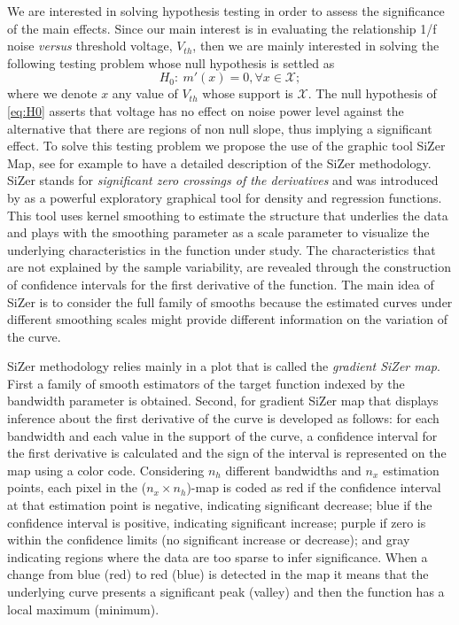 \documentclass[sn-mathphys]{sn-jnl}%
\theoremstyle{thmstyleone}%
\theoremstyle{thmstyletwo}%
\theoremstyle{thmstylethree}%
\begin{document}
\noindent We are interested in solving hypothesis testing in order to assess the significance of the main effects. Since our main interest is in evaluating the relationship 1/f noise \textit{versus} threshold voltage, $V_{th}$, then we are mainly interested in solving the following testing problem whose null hypothesis is settled as
\begin{equation}\label{eq:H0}
	H_0: \   m'(x)=0, \forall x \in \mathcal{X}; 
\end{equation}
where we denote $x$ any value of $V_{th}$ whose support is $\mathcal{X}$. The null hypothesis of \eqref{eq:H0} asserts that voltage has no effect on noise power level against the alternative that there are regions of non null slope, thus implying a significant effect. 
To solve this testing problem we propose the use of the graphic tool SiZer Map, see for example \cite{GNR2020} to have a detailed description of the SiZer methodology.
SiZer stands for \textit{significant zero crossings of the derivatives} and was introduced by \cite{CM1999} as a powerful exploratory graphical tool for density and regression functions. This tool uses kernel smoothing to estimate the structure that underlies the data and plays with the smoothing parameter as a scale parameter to visualize the underlying characteristics in the function under study. The characteristics that are not explained by the sample variability, are revealed through the construction of confidence intervals for the first derivative of the function. The main idea of SiZer is to consider the full family of smooths because the estimated curves under different smoothing scales might provide different information on the variation of the curve. 


SiZer methodology relies mainly in a plot that is called the \textit{gradient SiZer map}. First a family of smooth estimators of the target function indexed by the bandwidth parameter is obtained. Second, for gradient SiZer map that displays inference about the first derivative of the curve is developed as follows: for each bandwidth and each value in the support of the curve, a confidence interval for the first derivative is calculated and the sign of the interval is represented on the map using a color code. Considering $n_h$ different bandwidths and $n_x$ estimation points, each pixel in the ($n_x \times n_h$)-map is coded as red if the confidence interval at that estimation point is negative, indicating significant decrease; blue if the confidence interval is positive, indicating
significant increase; purple if zero is within the confidence limits (no significant increase or decrease); and gray indicating regions where the data are too sparse to infer significance.  When a change from blue (red) to red (blue) is detected in the map it means that the underlying curve presents a significant peak (valley) and then the function has a local maximum (minimum).
\end{document}
